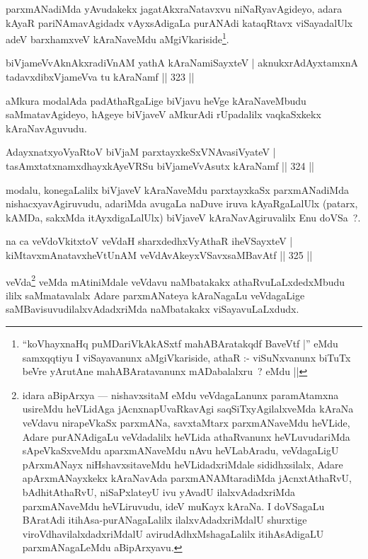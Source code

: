 \begin{artha}
parxmANadiMda yAvudakekx jagatAkxraNatavxvu niNaRyavAgideyo, adara kAyaR pariNAmavAgidadx vAyxsAdigaLa purANAdi kataqRtavx viSayadalUlx adeV barxhamxveV kAraNaveMdu aMgiVkariside\footnote[1]{``koVhayxnaHq puMDariVkAkASxtf mahABAratakqdf BaveVtf |'' eMdu samxqqtiyu I viSayavanunx aMgiVkariside, athaR :- viSuNxvanunx biTuTx beVre yArutAne mahABAratavanunx mADabalalxru~? eMdu ||}.
\end{artha}


\begin{shl}
biVjameVvAknAkxradiVnAM yathA kAraNamiSayxteV |
aknukxrAdAyxtamxnA tadavxdibxVjameVva tu kAraNamf \hfill || 323 ||
\end{shl}

\begin{artha}
aMkura modalAda padAthaRgaLige biVjavu heVge kAraNaveMbudu saMmatavAgideyo, hAgeye biVjaveV aMkurAdi rUpadalilx vaqkaSxkekx kAraNavAguvudu.
\end{artha}

		\begin{shl}
AdayxnatxyoVyaRtoV biVjaM parxtayxkeSxVNAvasiVyateV |
tasAmxtatxnamxdhayxkAyeVRSu biVjameVvAsutx kAraNamf \hfill || 324 ||
\end{shl}

\begin{artha}
modalu, konegaLalilx biVjaveV kAraNaveMdu parxtayxkaSx parxmANadiMda nishacxyavAgiruvudu, adariMda avugaLa naDuve iruva kAyaRgaLalUlx (patarx, kAMDa, sakxMda itAyxdigaLalUlx) biVjaveV kAraNavAgiruvalilx Enu doVSa~?.
\end{artha}


\begin{shl}
na ca veVdoVkitxtoV veVdaH sharxdedhxVyAthaR iheVSayxteV |
kiMtavxmAnatavxheVtUnAM veVdAvAkeyxVSavxsaMBavAtf \hfill || 325 ||
\end{shl}

\begin{artha}
veVda\footnote[1]{idara aBipArxya  {\rm ---}  nishavxsitaM eMdu veVdagaLanunx paramAtamxna usireMdu heVLidAga jAcnxnapUvaRkavAgi saqSiTxyAgilalxveMda kAraNa veVdavu nirapeVkaSx parxmANa, savxtaMtarx parxmANaveMdu heVLide, Adare purANAdigaLu veVdadalilx heVLida athaRvanunx heVLuvudariMda sApeVkaSxveMdu aparxmANaveMdu nAvu heVLabAradu, veVdagaLigU pArxmANayx niHshavxsitaveMdu heVLidadxriMdale sididhxsilalx, Adare apArxmANayxkekx kAraNavAda parxmANAMtaradiMda jAcnxtAthaRvU, bAdhitAthaRvU, niSaPxlateyU ivu yAvadU ilalxvAdadxriMda parxmANaveMdu heVLiruvudu, ideV muKayx kAraNa. I doVSagaLu BAratAdi itihAsa-purANagaLalilx ilalxvAdadxriMdalU shurxtige viroVdhavilalxdadxriMdalU avirudAdhxMshagaLalilx itihAsAdigaLU parxmANagaLeMdu aBipArxyavu.} veMda mAtiniMdale veVdavu naMbatakakx athaRvuLaLxdedxMbudu ililx  saMmatavalalx Adare parxmANateya kAraNagaLu veVdagaLige saMBavisuvudilalxvAdadxriMda naMbatakakx viSayavuLaLxdudx.
\end{artha}

